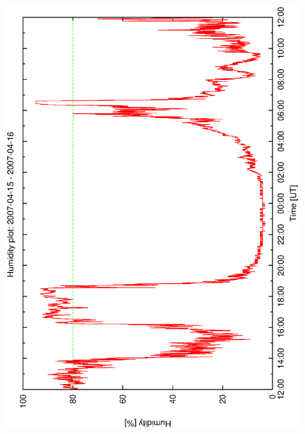 \begin{figure}[htbp]
\begin{center}
{    \includegraphics[scale=0.25, angle=-90]{figures/ecs/hum_1_2007_04_15.eps}
  }
\end{center}
\end{figure}
